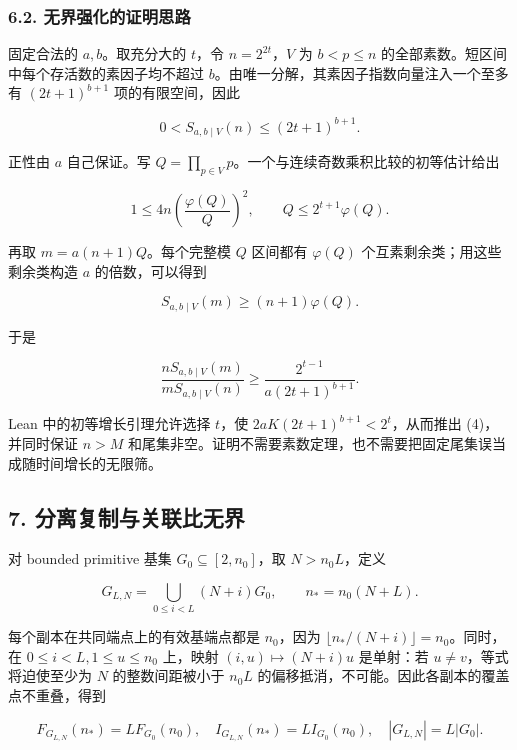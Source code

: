 \documentclass[
  11pt,
]{article}
\begin{document}
\hypertarget{ux65e0ux754cux5f3aux5316ux7684ux8bc1ux660eux601dux8def}{%
\subsubsection{6.2.
无界强化的证明思路}\label{ux65e0ux754cux5f3aux5316ux7684ux8bc1ux660eux601dux8def}}

固定合法的 \(a,b\)。取充分大的 \(t\)，令 \(n=2^{2t}\)，\(V\) 为
\(b<p\le n\) 的全部素数。短区间中每个存活数的素因子均不超过
\(b\)。由唯一分解，其素因子指数向量注入一个至多有 \((2t+1)^{b+1}\)
项的有限空间，因此

\[
0<S_{a,b\mid V}(n)\le(2t+1)^{b+1}.
\]

正性由 \(a\) 自己保证。写
\(Q=\prod_{p\in V}p\)。一个与连续奇数乘积比较的初等估计给出

\[
1\le4n\left(\frac{\varphi(Q)}Q\right)^2,
\qquad Q\le2^{t+1}\varphi(Q).
\]

再取 \(m=a(n+1)Q\)。每个完整模 \(Q\) 区间都有 \(\varphi(Q)\)
个互素剩余类；用这些剩余类构造 \(a\) 的倍数，可以得到

\[
S_{a,b\mid V}(m)\ge(n+1)\varphi(Q).
\]

于是

\[
\frac{nS_{a,b\mid V}(m)}{mS_{a,b\mid V}(n)}
\ge\frac{2^{t-1}}{a(2t+1)^{b+1}}.
\]

Lean 中的初等增长引理允许选择 \(t\)，使
\(2aK(2t+1)^{b+1}<2^t\)，从而推出 (4)，并同时保证 \(n>M\)
和尾集非空。证明不需要素数定理，也不需要把固定尾集误当成随时间增长的无限筛。

\hypertarget{ux5206ux79bbux590dux5236ux4e0eux5173ux8054ux6bd4ux65e0ux754c}{%
\subsection{7.
分离复制与关联比无界}\label{ux5206ux79bbux590dux5236ux4e0eux5173ux8054ux6bd4ux65e0ux754c}}

对 bounded primitive 基集 \(G_0\subseteq[2,n_0]\)，取 \(N>n_0L\)，定义

\[
G_{L,N}=\bigcup_{0\le i<L}(N+i)G_0,\qquad n_*=n_0(N+L).
\]

每个副本在共同端点上的有效基端点都是 \(n_0\)，因为
\(\lfloor n_* /(N+i)\rfloor=n_0\)。同时，在 \(0\le i<L,1\le u\le n_0\)
上，映射 \((i,u)\mapsto(N+i)u\) 是单射：若 \(u\ne v\)，等式将迫使至少为
\(N\) 的整数间距被小于 \(n_0L\)
的偏移抵消，不可能。因此各副本的覆盖点不重叠，得到

\[
F_{G_{L,N}}(n_*)=LF_{G_0}(n_0),\quad
I_{G_{L,N}}(n_*)=LI_{G_0}(n_0),\quad |G_{L,N}|=L|G_0|.
\]
\end{document}
